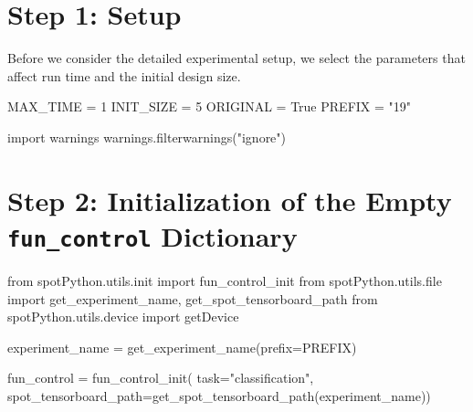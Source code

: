\documentclass[
  letterpaper,
  DIV=11,
  numbers=noendperiod]{scrreprt}
\newenvironment{Shaded}{\begin{snugshade}}{\end{snugshade}}
\newcommand{\BuiltInTok}[1]{\textcolor[rgb]{0.00,0.23,0.31}{#1}}
\newcommand{\DecValTok}[1]{\textcolor[rgb]{0.68,0.00,0.00}{#1}}
\newcommand{\ImportTok}[1]{\textcolor[rgb]{0.00,0.46,0.62}{#1}}
\newcommand{\NormalTok}[1]{\textcolor[rgb]{0.00,0.23,0.31}{#1}}
\newcommand{\OperatorTok}[1]{\textcolor[rgb]{0.37,0.37,0.37}{#1}}
\newcommand{\StringTok}[1]{\textcolor[rgb]{0.13,0.47,0.30}{#1}}
\newcommand{\VariableTok}[1]{\textcolor[rgb]{0.07,0.07,0.07}{#1}}
\begin{document}
\hypertarget{sec-setup-19}{%
\section{Step 1: Setup}\label{sec-setup-19}}

Before we consider the detailed experimental setup, we select the
parameters that affect run time and the initial design size.

\begin{Shaded}
\begin{Highlighting}[]
\NormalTok{MAX\_TIME }\OperatorTok{=} \DecValTok{1}
\NormalTok{INIT\_SIZE }\OperatorTok{=} \DecValTok{5}
\NormalTok{ORIGINAL }\OperatorTok{=} \VariableTok{True}
\NormalTok{PREFIX }\OperatorTok{=} \StringTok{"19"}
\end{Highlighting}
\end{Shaded}

\begin{Shaded}
\begin{Highlighting}[]
\ImportTok{import}\NormalTok{ warnings}
\NormalTok{warnings.filterwarnings(}\StringTok{"ignore"}\NormalTok{)}
\end{Highlighting}
\end{Shaded}

\hypertarget{step-2-initialization-of-the-empty-fun_control-dictionary-4}{%
\section{\texorpdfstring{Step 2: Initialization of the Empty
\texttt{fun\_control}
Dictionary}{Step 2: Initialization of the Empty fun\_control Dictionary}}\label{step-2-initialization-of-the-empty-fun_control-dictionary-4}}

\begin{Shaded}
\begin{Highlighting}[]
\ImportTok{from}\NormalTok{ spotPython.utils.init }\ImportTok{import}\NormalTok{ fun\_control\_init}
\ImportTok{from}\NormalTok{ spotPython.utils.}\BuiltInTok{file} \ImportTok{import}\NormalTok{ get\_experiment\_name, get\_spot\_tensorboard\_path}
\ImportTok{from}\NormalTok{ spotPython.utils.device }\ImportTok{import}\NormalTok{ getDevice}

\NormalTok{experiment\_name }\OperatorTok{=}\NormalTok{ get\_experiment\_name(prefix}\OperatorTok{=}\NormalTok{PREFIX)}

\NormalTok{fun\_control }\OperatorTok{=}\NormalTok{ fun\_control\_init(}
\NormalTok{    task}\OperatorTok{=}\StringTok{"classification"}\NormalTok{,}
\NormalTok{    spot\_tensorboard\_path}\OperatorTok{=}\NormalTok{get\_spot\_tensorboard\_path(experiment\_name))}
\end{Highlighting}
\end{Shaded}
\end{document}
